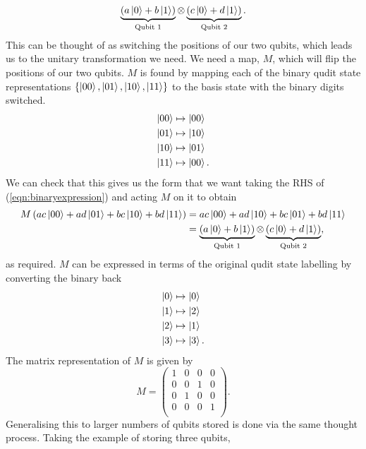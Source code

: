 \begin{equation}
    \underbrace{\left(a\ket{0} + b\ket{1}\right)}_{\text{Qubit 1}} \otimes \underbrace{\left(c\ket{0} + d\ket{1}\right)}_{\text{Qubit 2}}.
\end{equation}
This can be thought of as switching the positions of our two qubits, which leads us to the unitary transformation we need.
We need a map, $M$, which will flip the positions of our two qubits.
$M$ is found by mapping each of the binary qudit state representations $\{\ket{00}, \ket{01}, \ket{10}, \ket{11}\}$ to the basis state with the binary digits switched.
\begin{align}
    \ket{00} &\mapsto \ket{00}\\
    \ket{01} &\mapsto \ket{10}\\
    \ket{10} &\mapsto \ket{01}\\
    \ket{11} &\mapsto \ket{00}.
\end{align}
We can check that this gives us the form that we want taking the RHS of (\ref{eqn:binaryexpression}) and acting $M$ on it to obtain
\begin{align}
    M\left(ac\ket{00} + ad\ket{01} + bc\ket{10} + bd\ket{11}\right) 
    &=  ac\ket{00} + ad\ket{10} + bc\ket{01} + bd\ket{11}\\
    &= \underbrace{\left(a\ket{0} + b\ket{1}\right)}_{\text{Qubit 1}} \otimes \underbrace{\left(c\ket{0} + d\ket{1}\right)}_{\text{Qubit 2}},
\end{align}
as required.
$M$ can be expressed in terms of the original qudit state labelling by converting the binary back
\begin{align}
    \ket{0} &\mapsto \ket{0}\\
    \ket{1} &\mapsto \ket{2}\\
    \ket{2} &\mapsto \ket{1}\\
    \ket{3} &\mapsto \ket{3}.
\end{align}
The matrix representation of $M$ is given by
\begin{equation}
    M = 
    \begin{pmatrix}
        1 & 0 & 0 & 0\\
        0 & 0 & 1 & 0\\
        0 & 1 & 0 & 0\\
        0 & 0 & 0 & 1\\
    \end{pmatrix}.
\end{equation}
Generalising this to larger numbers of qubits stored is done via the same thought process. Taking the example of storing three qubits,

